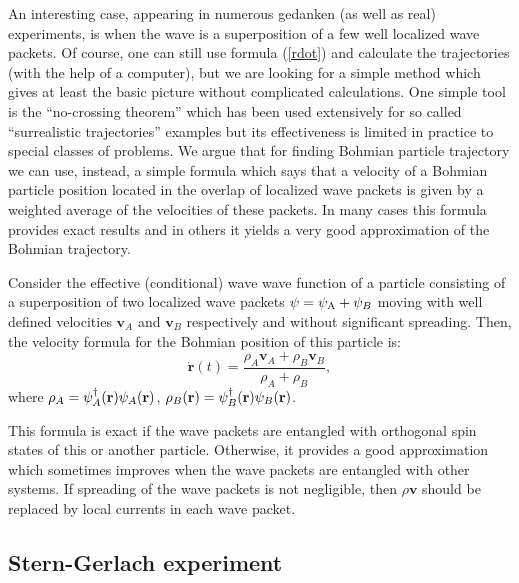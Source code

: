 \documentclass[12pt,preprint,tightenlines]{elsarticle}
\begin{document}
An interesting case, appearing in numerous gedanken (as well as real)
experiments, is when the wave is a superposition of a few well localized
wave packets. Of course, one can still use formula (\ref{rdot})
and calculate the trajectories (with the help of a computer), but we are
looking for a simple method which gives at least the basic picture
without complicated calculations. One simple tool is the ``no-crossing
theorem'' which has been used extensively for so called ``surrealistic
trajectories'' examples \cite{englert1992surrealistic} but its
effectiveness is limited in practice to special classes of problems.
We argue that for finding Bohmian particle trajectory we can use,
instead, a simple formula which says that a velocity of a Bohmian
particle position located in the overlap of localized wave packets
is given by a weighted average of the velocities of these packets.
In many cases this formula provides exact results and in others it
yields a very good approximation of the Bohmian trajectory.

Consider the effective (conditional) wave wave function of a particle
consisting of a superposition of two localized wave packets $\psi=\psi_{{\rm A}}+\psi_{B}$
moving with well defined velocities $\mathbf{v}_{A}$ and $\mathbf{v}_{B}$
respectively and without significant spreading. Then, the velocity
formula for the Bohmian position of this particle is:
 \begin{equation}
\dot{\boldsymbol{\textbf{r}}}(t)=\frac{{\rho_{A}\mathbf{v}_{A}+\rho_{B}\mathbf{v}_{B}}}{{\rho_{A}+\rho_{B}}},\label{v}
\end{equation}
 where $\rho_{A}=\psi_{A}^{\dagger}(\boldsymbol{{\rm r}})\psi_{A}(\boldsymbol{{\rm r}})$,
$\rho_{B}(\boldsymbol{{\rm r}})=\psi_{B}^{\dagger}(\boldsymbol{{\rm r}})\psi_{B}(\boldsymbol{{\rm r}})$.

This formula is exact if the wave packets are entangled with orthogonal
spin states of this or another particle. Otherwise, it provides a good
approximation which sometimes improves when the wave packets are entangled
with other systems. If spreading of the wave packets is not negligible, then $\rho\mathbf{v}$ should be replaced by local currents in each wave packet.


\subsection{ Stern-Gerlach experiment}
\end{document}
